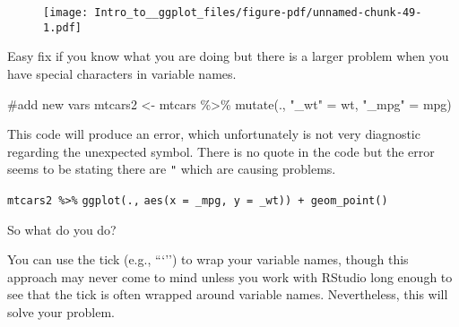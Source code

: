 \documentclass[
  letterpaper,
  DIV=11,
  numbers=noendperiod]{scrartcl}
\newenvironment{Shaded}{\begin{snugshade}}{\end{snugshade}}
\newcommand{\AttributeTok}[1]{\textcolor[rgb]{0.40,0.45,0.13}{#1}}
\newcommand{\CommentTok}[1]{\textcolor[rgb]{0.37,0.37,0.37}{#1}}
\newcommand{\FunctionTok}[1]{\textcolor[rgb]{0.28,0.35,0.67}{#1}}
\newcommand{\NormalTok}[1]{\textcolor[rgb]{0.00,0.23,0.31}{#1}}
\newcommand{\OtherTok}[1]{\textcolor[rgb]{0.00,0.23,0.31}{#1}}
\newcommand{\SpecialCharTok}[1]{\textcolor[rgb]{0.37,0.37,0.37}{#1}}
\newcommand{\StringTok}[1]{\textcolor[rgb]{0.13,0.47,0.30}{#1}}
\begin{document}
\begin{figure}[H]

{\centering \texttt{[image: Intro\_to\_\_ggplot\_files/figure-pdf/unnamed-chunk-49-1.pdf]}

}

\end{figure}

Easy fix if you know what you are doing but there is a larger problem
when you have special characters in variable names.

\begin{Shaded}
\begin{Highlighting}[]
\CommentTok{\#add new vars}
\NormalTok{mtcars2 }\OtherTok{\textless{}{-}}\NormalTok{ mtcars }\SpecialCharTok{\%\textgreater{}\%}
  \FunctionTok{mutate}\NormalTok{(., }
         \StringTok{"\_wt"} \OtherTok{=}\NormalTok{ wt,}
         \StringTok{"\_mpg"} \OtherTok{=}\NormalTok{ mpg)}
\end{Highlighting}
\end{Shaded}

This code will produce an error, which unfortunately is not very
diagnostic regarding the unexpected symbol. There is no quote in the
code but the error seems to be stating there are \texttt{"} which are
causing problems.

\texttt{mtcars2\ \%\textgreater{}\%} \texttt{ggplot(.,}
\texttt{aes(x\ =\ \_mpg,\ y\ =\ \_wt))\ +\ geom\_point()}

So what do you do?

You can use the tick (e.g., ```'') to wrap your variable names, though
this approach may never come to mind unless you work with RStudio long
enough to see that the tick is often wrapped around variable names.
Nevertheless, this will solve your problem.

\begin{Shaded}
\end{Shaded}
\end{document}
